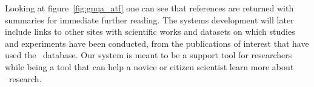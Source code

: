 

Looking at figure~\ref{fig:gnqa_atf} one can see that references are returned with summaries for immediate further reading.
The systems development will later include links to other sites with scientific works and datasets on which studies and experiments have been conducted, from the publications of interest that have used the \GN\ database.
Our system is meant to be a support tool for researchers while being a tool that can help a novice or citizen scientist learn more about \GN\ research.
